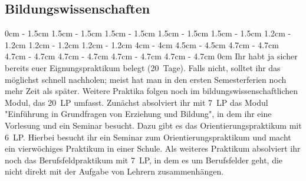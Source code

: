\begin{multicols*}{2}
\subsection*{Bildungswissenschaften}
0cm \columnwidth
0cm \columnwidth
0cm \columnwidth
0cm \columnwidth
0cm \columnwidth
1.5cm \dimexpr\columnwidth - 1.5cm
1.5cm \dimexpr\columnwidth - 1.5cm
1.5cm \dimexpr\columnwidth - 1.5cm
1.5cm \dimexpr\columnwidth - 1.5cm
1.5cm \dimexpr\columnwidth - 1.5cm
1.2cm \dimexpr\columnwidth - 1.2cm
1.2cm \dimexpr\columnwidth - 1.2cm
1.2cm \dimexpr\columnwidth - 1.2cm
4cm \dimexpr\columnwidth - 4cm
4.5cm \dimexpr\columnwidth - 4.5cm
4.7cm \dimexpr\columnwidth - 4.7cm
4.7cm \dimexpr\columnwidth - 4.7cm
4.7cm \dimexpr\columnwidth - 4.7cm
4.7cm \dimexpr\columnwidth - 4.7cm
4.7cm \dimexpr\columnwidth - 4.7cm
0cm \columnwidth
Ihr habt ja sicher bereits euer Eignungspraktikum belegt (20~Tage). Falls nicht, solltet ihr das möglichst schnell nachholen; meist hat man in den ersten Semesterferien noch mehr Zeit als später. Weitere Praktika folgen noch im bildungswissenschaftlichen Modul, das \SI{20}{LP} umfasst. Zunächst absolviert ihr mit \SI{7}{LP} das Modul "Einführung in Grundfragen von Erziehung und Bildung", in dem ihr eine Vorlesung und ein Seminar besucht. Dazu gibt es das Orientierungspraktikum mit \SI{6}{LP}. Hierbei besucht ihr ein Seminar zum Orientierungspraktikum und macht ein vierwöchiges Praktikum in einer Schule. Als weiteres Praktikum absolviert ihr noch das Berufsfeldpraktikum mit \SI{7}{LP}, in dem es um Berufsfelder geht, die nicht direkt mit der Aufgabe von Lehrern zusammenhängen.



\end{multicols*}
